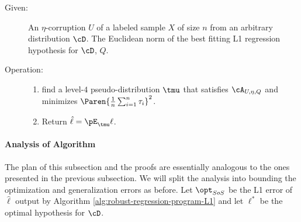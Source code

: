 \begin{mdframed}
  \begin{algorithms}
     \label{alg:robust-regression-program-L1}\mbox{}
    \begin{description}
    \item[Given:]
     An $\eta$-corruption $U$ of a labeled sample $X$ of size $n$ from an arbitrary distribution $\cD$. 
    The Euclidean norm of the best fitting L1 regression hypothesis for $\cD$, $Q$.
    \item[Operation:]\mbox{}
      \begin{enumerate}
      \item 
        find a level-$4$ pseudo-distribution $\tmu$ that satisfies $\cA_{U,\eta,Q}$ and minimizes $\Paren{\frac{1}{n}\sum_{i = 1}^n \tau_i}^2$.
      \item
        Return $\hat{\ell} = \pE_{\tmu}\ell$.%
      \end{enumerate}
    \end{description}    
  \end{algorithms}
\end{mdframed}



\paragraph{Analysis of Algorithm}
The plan of this subsection and the proofs are essentially analogous to the ones presented in the previous subsection. We will split the analysis into bounding the optimization and generalization errors as before. Let $\opt_{SoS}$ be the L1 error of $\hat{\ell}$ output by Algorithm \ref{alg:robust-regression-program-L1} and let $\ell^{*}$ be the optimal hypothesis for $\cD$. 


